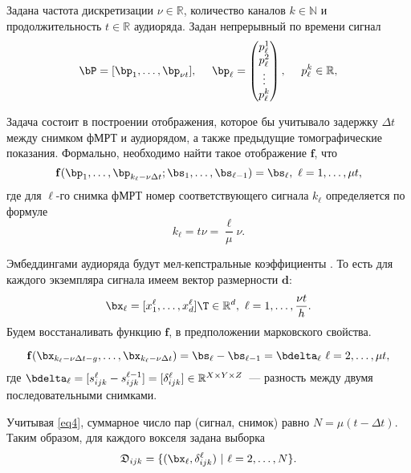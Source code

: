 \documentclass[12pt, twoside]{article}
\begin{document}
Задана частота дискретизации $\nu \in \mathbb{R}$, количество каналов $k \in \mathbb{N}$ и продолжительность $t \in \mathbb{R}$ аудиоряда.
Задан непрерывный по времени сигнал
\begin{equation}
	\label{eq2}
	\bP = [\bp_1, \ldots, \bp_{\nu t}], \quad\
	\bp_{\ell} = 
        \begin{pmatrix}
        p_\ell^1\\
        p_\ell^2 \\
        \vdots \\
        p_\ell^k\\
        \end{pmatrix}, \quad\
	p_{\ell}^k \in \mathbb{R},
\end{equation}

Задача состоит в построении отображения, которое бы учитывало задержку $\Delta t$ между
снимком фМРТ и аудиорядом, а также предыдущие томографические показания. Формально, необходимо
найти такое отображение $\mathbf{f}$, что
\begin{equation}
	\label{eq3}
	\mathbf{f}(\bp_1, \ldots, \bp_{k_{\ell} - \nu \Delta t}; \bs_1, \ldots, \bs_{\ell-1}) = \bs_{\ell},
	\ \ell = 1, \ldots, \mu t,
\end{equation}
где для $\ell$-го снимка фМРТ номер соответствующего сигнала $k_{\ell}$ определяется по формуле
\begin{equation}
	\label{eq4}
	k_{\ell} = t\nu = \dfrac{\ell}{\mu}\nu.
\end{equation}

Эмбеддингами аудиоряда будут мел-кепстральные коэффициенты \citep{mfcc}. То есть
для каждого экземпляра сигнала имеем вектор размерности $\mathbf{d}$:
\begin{equation}
	\label{eq5}
 \bx_{\ell} = [x^{\ell}_1, \ldots, x^{\ell}_{d}]\T \in \mathbb{R}^{d}, \ {\ell} = 1, \ldots, \dfrac{\nu t}{h}. 
\end{equation}
Будем восстаналивать функцию $\mathbf{f}$, в предположении марковского свойства. 

\begin{equation}
	\label{eq6}
	\mathbf{f}(\bx_{k_\ell - 
 \nu\Delta t - g}, \ldots, \bx_{k_\ell - 
 \nu\Delta t}) = \bs_\ell - \bs_{\ell-1} = \bdelta_\ell
	\ \ell = 2, \ldots, \mu t,
\end{equation}
где $\bdelta_{\ell} = [s^{\ell}_{ijk} - s^{\ell-1}_{ijk}] = [\delta^{\ell}_{ijk}] \in \mathbb{R}^{X \times Y \times Z}$~--- разность между двумя последовательными снимками.


Учитывая \eqref{eq4}, суммарное число пар (сигнал, снимок)
равно $N = \mu (t - \Delta t)$. Таким образом, для каждого вокселя задана выборка
\[ \mathfrak{D}_{ijk} = \{(\bx_{\ell}, \delta^{\ell}_{ijk}) \ | \ {\ell} = 2, \ldots, N \}. \]
\end{document}
